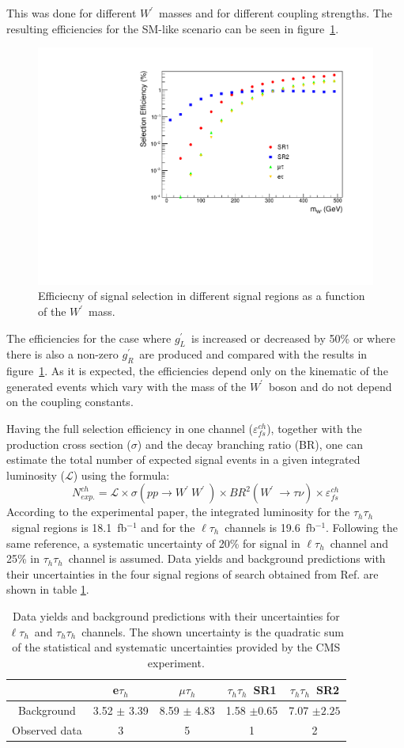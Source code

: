 \documentclass[preprint,showpacs,preprintnumbers]{revtex4}
\newcommand{\wprime}{\ensuremath{W^\prime}~}
\newcommand{\Tau}{\ensuremath{\tau_h}}
\newcommand{\tauTau}{\ensuremath{\tau_h\tau_h}}
\newcommand{\lepTau}{\ensuremath{\ell\tau_h}}
\newcommand{\gR}{\ensuremath{g^\prime_R}}
\newcommand{\gL}{\ensuremath{g^\prime_L}}
\begin{document}
This was done for different \wprime masses and for different coupling strengths. The resulting efficiencies for the SM-like scenario can be seen in figure~\ref{fig:EfficiencyGraphs}. 
\begin{figure}[!htb]
	\centering
	\includegraphics*[width=.45\textwidth]{EfficiencyGraphs.pdf}
	\caption{Efficiecny of signal selection in different signal regions as a function of the \wprime mass.}
	\label{fig:EfficiencyGraphs}
\end{figure}
The efficiencies for the case where \gL ~is increased or decreased by 50\% or where there is also a non-zero \gR ~are produced and compared with the results in figure~\ref{fig:EfficiencyGraphs}. As it is expected, the efficiencies depend only on the kinematic of the generated events which vary with the mass of the \wprime boson and do not depend on the coupling constants.

Having the full selection efficiency in one channel ($\varepsilon^{ch}_{fs}$), together with the production cross section ($\sigma$) and the decay branching ratio (BR), one can estimate the total number of expected signal events in a given integrated luminosity ($\mathcal{L}$) using the formula:
\begin{equation}
N^{ch}_{exp.}= \mathcal{L} \times \sigma(pp \to \wprime\wprime) \times BR^{2}(\wprime \to \tau \nu) \times \varepsilon^{ch}_{fs}
\end{equation}
According to the experimental paper, the integrated luminosity for the \tauTau ~signal regions is 18.1~fb$^{-1}$ and for the \lepTau ~channels is 19.6~fb$^{-1}$. Following the same reference, a systematic uncertainty of 20\% for signal in \lepTau ~channel and 25\% in \tauTau ~channel is assumed. Data yields and background predictions with their uncertainties in the four signal regions of search obtained from Ref.\cite{Khachatryan:2016trj} are shown in table \ref{tab:yields}. 
\begin{table}[htb]
	\centering
	\caption{Data yields and background predictions with their uncertainties for \lepTau ~and \tauTau ~channels. The shown uncertainty is the quadratic sum of the statistical and systematic uncertainties provided by the CMS experiment.\label{tab:yields} }
	\begin{tabular}{|c|c|c|c|c|}
		\hline 
		&    e\Tau       &  $\mu\Tau$     &  \tauTau ~SR1  & \tauTau ~SR2 \\
		\hline 
		Background &3.52 $\pm$ 3.39 &8.59 $\pm$ 4.83 &1.58 $\pm$0.65 &7.07 $\pm2.25$ \\     
		Observed data& 3            &      5         &    1          &    2    \\  
		\hline
	\end{tabular}
\end{table}
\end{document}
